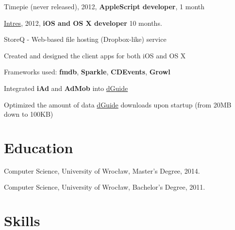 \documentclass[letterpaper]{article}
\renewenvironment{itemize}{
  \begin{list}{}{
    \setlength{\leftmargin}{1.5em}
  }
}{
  \end{list}
}
\begin{document}
\begin{itemize}
	\item Timepie (never released), 2012, {\bf AppleScript developer}, 1 month

    \item \href{http://intres.com.pl}{Intres}, 2012, {\bf iOS and OS X developer} 10 months.
		\begin{itemize}

            \item StoreQ - Web-based file hosting (Dropbox-like) service
                \begin{itemize}
                    \item Created and designed the client apps for both iOS and OS X
                    \item Frameworks used: {\bf fmdb}, {\bf Sparkle}, {\bf CDEvents}, {\bf Growl}
                \end{itemize}

            \item Integrated {\bf iAd} and {\bf AdMob} into \href{http://dguide.pl}{dGuide}

            \item Optimized the amount of data \href{http://dguide.pl}{dGuide} downloads upon startup (from 20MB down to 100KB)

        \end{itemize}

\end{itemize}

\section*{Education}

\begin{itemize}
  	\item Computer Science, University of Wrocław, Master's Degree, 2014.
  	\item Computer Science, University of Wrocław, Bachelor's Degree, 2011.
\end{itemize}

\section*{Skills}
\end{document}
